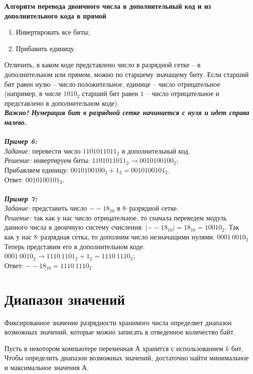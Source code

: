 \begin{center}
  \textbf{Алгоритм перевода двоичного числа в дополнительный код и из дополнительного кода в прямой}
\end{center}
\begin{enumerate}
\item Инвертировать все биты;
\item Прибавить единицу.
\end{enumerate}

Отличить, в каком коде представлено число в разрядной сетке -- в дополнительном или прямом, можно по старшему значащему биту. Если старший бит равен нулю -- число положительное, единице -- число отрицательное (например, в числе $1010_{2}$ старший бит равен $1$ -- число отрицательное и представлено в дополнительном коде).
\\\textbf{\emph{Важно! Нумерация бит в разрядной сетке начинается с нуля и идет справа налево.}}
\\
\\\emph{\textbf{Пример 6:}}
\\\emph{Задание:} перевести число $1101011011_{2}$ в дополнительный код.
\\\emph{Решение:} инвертируем биты: $1101011011_{2} \to 0010100100_{2}$;
\\Прибавляем единицу: $0010100100_{2} + 1_{2} = 0010100101_{2}$.
\\Ответ: $0010100101_{2}$.
\\
\\\emph{\textbf{Пример 7:}}
\\\emph{Задание:} представить число $--18_{10}$ в 8--разрядной сетке.
\\\emph{Решение:} так как у нас число отрицательное, то сначала переведем модуль данного числа в двоичную систему счисления: $|--18_{10}| = 18_{10} = 10010_{2}$.
Так как у нас 8--разрядная сетка, то дополним число незначащими нулями: $0001\ 0010_{2}$
Теперь представим его в дополнительном коде: $0001\ 0010_{2} \to 1110\ 1101_{2} + 1_{2} = 1110\ 1110_{2}$;\\
Ответ: $--18_{10} = 1110\ 1110_{2}$

\section{Диапазон значений}
Фиксированное значение разрядности хранимого числа определяет диапазон возможных значений, которые можно записать в отведенное количество байт.

Пусть в некотором компьютере переменная А хранится с использованием $k$ бит. Чтобы определить диапазон возможных значений, достаточно найти минимальное и максимальное значения А. 

